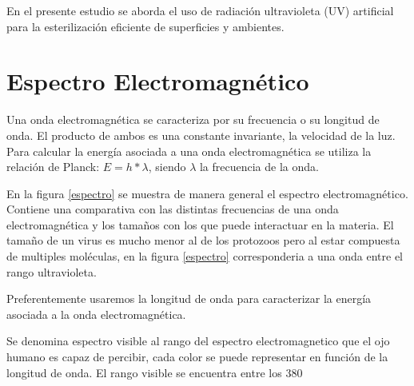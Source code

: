 \documentclass[letterpaper,12pt]{article}
\begin{document}
En el presente estudio se aborda el uso de radiación ultravioleta (UV) artificial para la esterilización eficiente de superficies y ambientes.

\section{Espectro Electromagnético}  

Una onda electromagnética se caracteriza por su frecuencia o su longitud de onda. El producto de ambos es una constante invariante, la velocidad de la luz. Para calcular la energía asociada a una onda electromagnética se utiliza la relación de Planck: $E= h * \lambda$, siendo $\lambda$ la frecuencia de la onda.

En la figura \ref{espectro} se muestra de manera general el espectro electromagnético. Contiene una comparativa con las distintas frecuencias de una onda electromagnética y los tamaños con los que puede interactuar en la materia. 
El tamaño de un virus es mucho menor al de los protozoos pero al estar compuesta de multiples moléculas, en la figura \ref{espectro} corresponderia a una onda entre el rango ultravioleta.

Preferentemente usaremos la longitud de onda para caracterizar la energía asociada a la onda electromagnética.

Se denomina espectro visible al rango del espectro electromagnetico que el ojo humano es capaz de percibir, cada color se puede representar en función de la longitud de onda. El rango visible se encuentra entre los 380  
\end{document}
